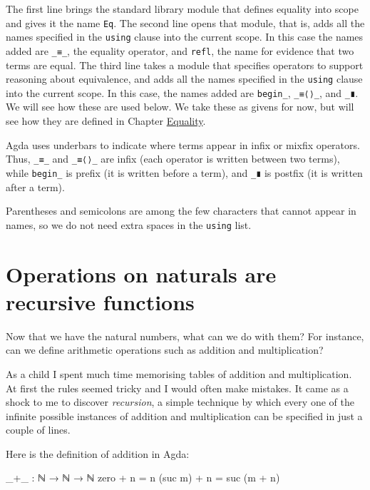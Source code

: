 The first line brings the standard library module that defines equality
into scope and gives it the name \texttt{Eq}. The second line opens that
module, that is, adds all the names specified in the \texttt{using}
clause into the current scope. In this case the names added are
\texttt{\_≡\_}, the equality operator, and \texttt{refl}, the name for
evidence that two terms are equal. The third line takes a module that
specifies operators to support reasoning about equivalence, and adds all
the names specified in the \texttt{using} clause into the current scope.
In this case, the names added are \texttt{begin\_}, \texttt{\_≡⟨⟩\_},
and \texttt{\_∎}. We will see how these are used below. We take these as
givens for now, but will see how they are defined in Chapter
\protect\hyperlink{Equality}{Equality}.

Agda uses underbars to indicate where terms appear in infix or mixfix
operators. Thus, \texttt{\_≡\_} and \texttt{\_≡⟨⟩\_} are infix (each
operator is written between two terms), while \texttt{begin\_} is prefix
(it is written before a term), and \texttt{\_∎} is postfix (it is
written after a term).

Parentheses and semicolons are among the few characters that cannot
appear in names, so we do not need extra spaces in the \texttt{using}
list.

\hypertarget{Naturals-plus}{%
\section{Operations on naturals are recursive
functions}\label{Naturals-plus}}

Now that we have the natural numbers, what can we do with them? For
instance, can we define arithmetic operations such as addition and
multiplication?

As a child I spent much time memorising tables of addition and
multiplication. At first the rules seemed tricky and I would often make
mistakes. It came as a shock to me to discover \emph{recursion}, a
simple technique by which every one of the infinite possible instances
of addition and multiplication can be specified in just a couple of
lines.

Here is the definition of addition in Agda:

\begin{fence}
\begin{code}
_+_ : ℕ → ℕ → ℕ
zero + n = n
(suc m) + n = suc (m + n)
\end{code}
\end{fence}

